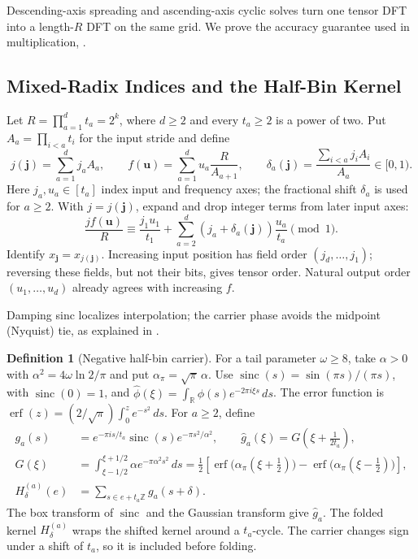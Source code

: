 \documentclass[11pt]{article}
\theoremstyle{definition}
\newtheorem{definition}[theorem]{Definition}
\renewcommand{\label}[1]{}%
\newcommand{\R}{\mathbb{R}}
\newcommand{\Z}{\mathbb{Z}}
\newcommand{\sinc}{\operatorname{sinc}}
\newcommand{\erf}{\operatorname{erf}}
\begin{document}
Descending-axis spreading and ascending-axis cyclic solves turn one tensor
DFT into a length-$R$ DFT on the same grid.
We prove the accuracy guarantee used in multiplication,
.

\subsection{Mixed-Radix Indices and the Half-Bin Kernel}
\label{sec:bridge-kernel}

Let $R=\prod_{a=1}^dt_a=2^k$, where $d\ge2$ and every $t_a\ge2$
is a power of two. Put $A_a=\prod_{i<a}t_i$ for the input stride and define
\[
 j(\mathbf j)=\sum_{a=1}^dj_aA_a,\qquad
 f(\mathbf u)=\sum_{a=1}^du_a\frac{R}{A_{a+1}},\qquad
 \delta_a(\mathbf j)=\frac{\sum_{i<a}j_iA_i}{A_a}\in[0,1).
\]
Here $j_a,u_a\in[t_a]$ index input and frequency axes;
the fractional shift $\delta_a$ is used for $a\ge2$.
With $j=j(\mathbf j)$, expand and drop integer terms from later input axes:
\[
 \frac{j f(\mathbf u)}R
 \equiv\frac{j_1u_1}{t_1}
       +\sum_{a=2}^d(j_a+\delta_a(\mathbf j))\frac{u_a}{t_a}
       \pmod1.
\]
Identify $x_{\mathbf j}=x_{j(\mathbf j)}$.
Increasing input position has field order $(j_d,\ldots,j_1)$;
reversing these fields, but not their bits, gives tensor order.
Natural output order $(u_1,\ldots,u_d)$ already agrees with increasing $f$.

Damping sinc localizes interpolation; the carrier phase avoids the midpoint
(Nyquist) tie, as explained in .

\begin{definition}[Negative half-bin carrier]\label{def:carrier}
For a tail parameter $\omega\ge8$, take $\alpha>0$ with
$\alpha^2=4\omega\ln2/\pi$ and put $\alpha_\pi=\sqrt\pi\,\alpha$.
Use $\sinc(s)=\sin(\pi s)/(\pi s)$, with $\sinc(0)=1$, and
$\widehat\phi(\xi)=\int_\R\phi(s)e^{-2\pi i\xi s}\,ds$.
The error function is $\erf(z)=(2/\sqrt\pi)\int_0^z e^{-s^2}\,ds$.
For $a\ge2$, define
\begin{align*}
 g_a(s)&=e^{-\pi is/t_a}\sinc(s)e^{-\pi s^2/\alpha^2},
 \qquad \widehat g_a(\xi)=G\left(\xi+\frac1{2t_a}\right),\\
 G(\xi)&=\int_{\xi-1/2}^{\xi+1/2}\alpha e^{-\pi\alpha^2s^2}\,ds
 =\frac12\left[
 \erf\bigl(\alpha_\pi(\xi+\tfrac12)\bigr)
 -\erf\bigl(\alpha_\pi(\xi-\tfrac12)\bigr)\right],\\
 H_\delta^{(a)}(e)&=\sum_{s\in e+t_a\Z}g_a(s+\delta).
\end{align*}
The box transform of $\sinc$ and the Gaussian transform give $\widehat g_a$.
The folded kernel $H_\delta^{(a)}$ wraps the shifted kernel around a
$t_a$-cycle.
The carrier changes sign under a shift of $t_a$, so it is included before folding.
\end{definition}
\end{document}
